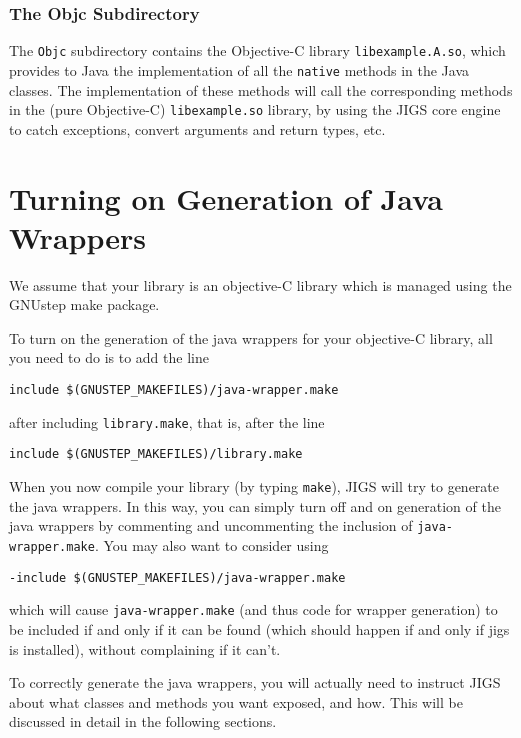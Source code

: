 \subsubsection{The Objc Subdirectory}

The \texttt{Objc} subdirectory contains the Objective-C library 
\texttt{libexample.A.so}, which provides to Java the implementation 
of all the \texttt{native} methods in the Java classes.  The
implementation of these methods will call the corresponding methods in
the (pure Objective-C) \texttt{libexample.so} library, by using the
JIGS core engine to catch exceptions, convert arguments and return
types, etc.

\section{Turning on Generation of Java Wrappers}
We assume that your library is an objective-C library which is managed
using the GNUstep make package.

To turn on the generation of the java wrappers for your objective-C
library, all you need to do is to add the line
\begin{verbatim}
include $(GNUSTEP_MAKEFILES)/java-wrapper.make
\end{verbatim}
after including \texttt{library.make}, that is, after the line
\begin{verbatim}
include $(GNUSTEP_MAKEFILES)/library.make
\end{verbatim}

When you now compile your library (by typing \texttt{make}), JIGS will
try to generate the java wrappers.  In this way, you can simply turn
off and on generation of the java wrappers by commenting and
uncommenting the inclusion of \texttt{java-wrapper.make}.  
You may also want to consider using 
\begin{verbatim}
-include $(GNUSTEP_MAKEFILES)/java-wrapper.make
\end{verbatim}
which will cause \texttt{java-wrapper.make} (and thus code for wrapper
generation) to be included if and only if it can be found (which
should happen if and only if jigs is installed), without complaining
if it can't.

To correctly generate the java wrappers, you will actually need to
instruct JIGS about what classes and methods you want exposed, and
how.  This will be discussed in detail in the following sections.

